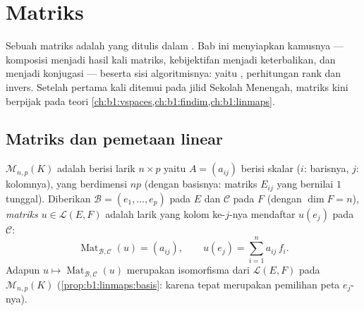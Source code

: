 \chapter{Matriks}\label{ch:b1:matrices}

Sebuah matriks adalah  yang ditulis dalam . Bab ini
menyiapkan kamusnya --- komposisi menjadi hasil kali matriks, kebijektifan
menjadi keterbalikan, dan  menjadi konjugasi --- beserta
sisi algoritmisnya: yaitu , perhitungan rank dan
invers. Setelah pertama kali ditemui pada jilid Sekolah Menengah, matriks kini
berpijak pada teori
\cref{ch:b1:vspaces,ch:b1:findim,ch:b1:linmaps}.

\section{Matriks dan pemetaan linear}

\begin{definition}\label{def:b1:matrices:def}
 $\mathcal{M}_{n,p}(K)$ adalah  berisi larik $n \times p$ yaitu $A
= (a_{ij})$ berisi skalar ($i$: barisnya, $j$: kolomnya), yang berdimensi $np$
(dengan basisnya: matriks $E_{ij}$ yang bernilai $1$ tunggal). Diberikan 
$\mathcal{B} = (e_1, \dots, e_p)$ pada $E$ dan $\mathcal{C}$ pada $F$
(dengan $\dim F = n$), \emph{matriks $u \in \mathcal{L}(E, F)$} adalah
larik yang kolom ke-$j$-nya mendaftar  $u(e_j)$ pada
$\mathcal{C}$:
\[
\operatorname{Mat}_{\mathcal{B},\mathcal{C}}(u) = (a_{ij}),
\qquad u(e_j) = \sum_{i=1}^{n} a_{ij}\, f_i .
\]
Adapun  $u \mapsto \operatorname{Mat}_{\mathcal{B},\mathcal{C}}(u)$
merupakan isomorfisma dari $\mathcal{L}(E, F)$ pada
$\mathcal{M}_{n,p}(K)$ (\cref{prop:b1:linmaps:basis}: karena 
tepat merupakan pemilihan peta $e_j$-nya).
\end{definition}

